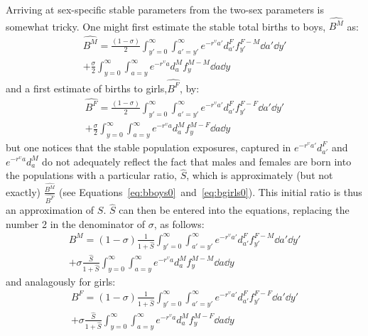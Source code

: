 Arriving at sex-specific stable parameters from the two-sex parameters is
somewhat tricky. One might first estimate the stable total births to boys,
$\widehat{B^M}$ as:
\begin{equation}
\begin{split}
\label{eq:bboys0}
\widehat{B^M} = \frac{(1-\sigma)}{2} \int _{y'=0}^\infty \int _{a'=y'}^\infty
e^{-r^\upsilon a'} d_{a'}^F f_{y'}^{F-M} \dd a' \dd y' \\
+ \frac{\sigma}{2} \int _{y=0}^\infty \int _{a=y}^\infty e^{-r^\upsilon a}
d_{a}^M f_{y}^{M-M} \dd a \dd y
\end{split}
\end{equation}
and a first estimate of births to girls,$\widehat{B^F}$, by:
\begin{equation}
\begin{split}
\label{eq:bgirls0}
\widehat{B^F} = \frac{(1-\sigma)}{2} \int _{y'=0}^\infty \int _{a'=y'}^\infty
e^{-r^\upsilon a'} d_{a'}^F f_{y'}^{F-F} \dd a' \dd y' \\
+ \frac{\sigma}{2} \int _{y=0}^\infty \int _{a=y}^\infty e^{-r^\upsilon a}
d_{a}^M f_{y}^{M-F} \dd a \dd y
\end{split}
\end{equation}
but one notices that the stable population exposures, captured in
$e^{-r^\upsilon a'} d_{a'}^F$ and $e^{-r^\upsilon a}d_{a}^M$ do not
adequately reflect the fact that males and females are born 
into the populations with a particular ratio, $\hat{S}$,
which is approximately (but not exactly) $\frac{\widehat{B^M}}{\widehat{B^F}}$
(see Equations~\eqref{eq:bboys0}~and~\eqref{eq:bgirls0}). This initial ratio is
thus an approximation of $S$. $\hat{S}$ can then be entered into the equations,
replacing the number 2 in the denominator of $\sigma$, as follows:
\begin{equation}
\begin{split}
\label{eq:bboys0}
B^M = (1-\sigma) \frac{1}{1+\hat{S}} \int _{y'=0}^\infty \int
_{a'=y'}^\infty e^{-r^\upsilon a'} d_{a'}^F f_{y'}^{F-M} \dd a' \dd y' \\
+ \sigma \frac{\hat{S}}{1+\hat{S}} \int _{y=0}^\infty \int _{a=y}^\infty
e^{-r^\upsilon a} d_{a}^M f_{y}^{M-M} \dd a \dd y
\end{split}
\end{equation}
and analagously for girls:
\begin{equation}
\begin{split}
\label{eq:bgirls0}
B^F = (1-\sigma)\frac{1}{1+\hat{S}}\int _{y'=0}^\infty \int _{a'=y'}^\infty
e^{-r^\upsilon a'} d_{a'}^F f_{y'}^{F-F} \dd a' \dd y' \\
+ \sigma \frac{\hat{S}}{1+\hat{S}}\int _{y=0}^\infty \int _{a=y}^\infty
e^{-r^\upsilon a} d_{a}^M f_{y}^{M-F} \dd a \dd y
\end{split}
\end{equation}
